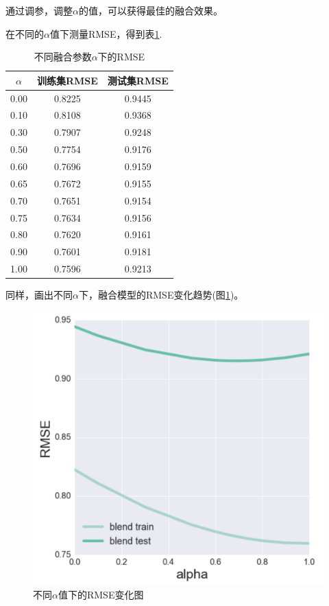 \documentclass[utf8, a4paper, 11pt, onecolumn]{ctexart}
\begin{document}
\begin{spacing}{1.3}
通过调参，调整$\alpha$的值，可以获得最佳的融合效果。

在不同的$\alpha$值下测量RMSE，得到表\ref{alpha-table}.

\begin{table}[h]
	\centering
	\begin{tabular}{|c|c|c|}
		\hline
		\textbf{$\alpha$} & 训练集RMSE & 测试集RMSE \\
		\hline
		0.00 & 0.8225 & 0.9445 \\
		\hline
		0.10 & 0.8108 & 0.9368 \\
		\hline
		0.30 & 0.7907 & 0.9248 \\
		\hline
		0.50 & 0.7754 & 0.9176 \\
		\hline
		0.60 & 0.7696 & 0.9159 \\
		\hline
		0.65 & 0.7672 & 0.9155 \\
		\hline
		0.70 & 0.7651 & 0.9154 \\
		\hline
		0.75 & 0.7634 & 0.9156 \\
		\hline
		0.80 & 0.7620 & 0.9161 \\
		\hline
		0.90 & 0.7601 & 0.9181 \\
		\hline
		1.00 & 0.7596 & 0.9213 \\
		\hline
	\end{tabular}
	\caption{不同融合参数$\alpha$下的RMSE}
	\label{alpha-table}
\end{table}

同样，画出不同$\alpha$下，融合模型的RMSE变化趋势(图\ref{alpha-figure})。

\begin{figure}[ht]
	\centering
	\includegraphics[width=0.8\linewidth]{alpha-figure.png}
	\caption{不同$\alpha$值下的RMSE变化图}
	\label{alpha-figure}
\end{figure}


\end{spacing}
\end{document}
